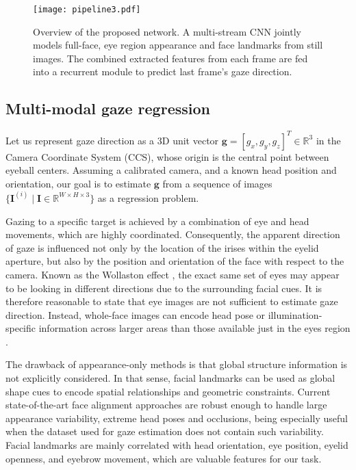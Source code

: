 \documentclass{bmvc2k}
\begin{document}
\begin{figure}
	\begin{center}
		\texttt{[image: pipeline3.pdf]}
	\end{center}
	\caption{Overview of the proposed network. A multi-stream CNN jointly models full-face, eye region appearance and face landmarks from still images. The combined extracted features from each frame are fed into a recurrent module to predict last frame's gaze direction.}
	\label{fig:architecture}\end{figure}


\subsection{Multi-modal gaze regression}

Let us represent gaze direction as a 3D unit vector $\mathbf{g} = [g_x, g_y, g_z]^T \in \mathbb{R}^3$ in the Camera Coordinate System (CCS), whose origin is the central point between eyeball centers. Assuming a calibrated camera, and a known head position and orientation, our goal is to estimate $\mathbf{g}$ from a sequence of images $\{\mathbf{I}^{(i)} \mid \mathbf{I} \in \mathbb{R}^{W \times H \times 3} \}$ as a regression problem. 

Gazing to a specific target is achieved by a combination of eye and head movements, which are highly coordinated. Consequently, the apparent direction of gaze is influenced not only by the location of the irises within the eyelid aperture, but also by the position and orientation of the face with respect to the camera. Known as the Wollaston effect \cite{wollaston1824xiii}, the exact same set of eyes may appear to be looking in different directions due to the surrounding facial cues. It is therefore reasonable to state that eye images are not sufficient to estimate gaze direction. Instead, whole-face images can encode head pose or illumination-specific information across larger areas than those available just in the eyes region \cite{zhang2017s, krafka2016eye}. 

The drawback of appearance-only methods is that global structure information is not explicitly considered. In that sense, facial landmarks can be used as global shape cues to encode spatial relationships and geometric constraints. Current state-of-the-art face alignment approaches are robust enough to handle large appearance variability, extreme head poses and occlusions, being especially useful when the dataset used for gaze estimation does not contain such variability. Facial landmarks are mainly correlated with head orientation, eye position, eyelid openness, and eyebrow movement, which are valuable features for our task. 
\end{document}
